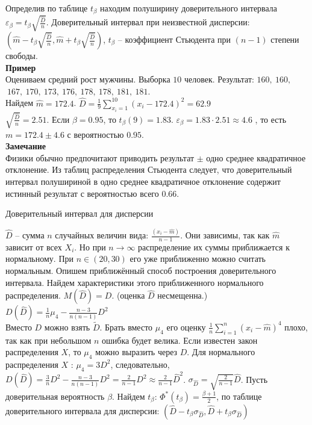 \documentclass[russian, 12pt, fleqn]{article}
\begin{document}
Определив по таблице $t_\beta$ находим полуширину доверительного интервала $\varepsilon_\beta = t_\beta \sqrt{\frac{\hat{D}}{n}}$. Доверительный интервал при неизвестной дисперсии: $(\hat{m} - t_\beta \sqrt{\frac{\hat{D}}{n}}, \hat{m} + t_\beta \sqrt{\frac{\hat{D}}{n}} )$, $t_\beta$  -- коэффициент Стьюдента при $(n-1)$ степени свободы.\\
\textbf{Пример}\\
Оцениваем средний рост мужчины. Выборка $10$ человек. Результат: $160,\ 160,$\\
 $\ 167,\ 170,\ 173,\ 176,\ 178,\ 178,\ 181,\ 181$.\\
Найдем $\hat{m} = 172.4$. $\hat{D} = \frac{1}{9} \displaystyle{\sum \limits _{x_i = 1}^{10}} (x_i - 172.4)^2 = 62.9$\\
$\sqrt{\frac{\hat{D}}{n}} = 2.51$. Если $\beta = 0.95$, то $t_\beta(9) = 1.83$. $\varepsilon_\beta = 1.83 \cdot 2.51 \approx 4.6$ , то есть $m=172.4 \pm 4.6$ с вероятностью $0.95$.\\
\textbf{Замечание\ } \\
Физики обычно предпочитают приводить результат $\pm$ одно среднее квадратичное отклонение. Из таблиц распределения Стьюдента следует, что доверительный интервал полушириной в одно среднее  квадратичное отклонение содержит истинный результат с вероятностью всего $0.66$.
\begin{center}
$\textbf{Доверительный интервал для дисперсии }$
\end{center}
$\hat{D}$ -- сумма $n$ случайных величин вида: $\frac{(x_i - \hat{m})}{n - 1}$. Они зависимы, так как $\hat{m}$ зависит от всех $X_i$. Но при  $n \rightarrow \infty$ распределение их суммы приближается к нормальному. При $n \in (20, 30)$ его уже приближенно можно считать нормальным. Опишем 
приближённый способ построения доверительного интервала. Найдем характеристики этого приближенного нормального распределения. $M(\hat{D}) = D$. (оценка $\hat{D}$ несмещенна.)\\ $D(\hat{D}) = \frac{1}{n}\mu_4 - \frac{n-3}{n(n-1)}D^2$\\
Вместо $D$ можно взять $\tilde{D}$. Брать вместо $\mu_4$ его оценку $\frac{1}{n}\displaystyle{\sum \limits _{i=1} ^ {n} } (x_i - \hat{m})^4$ плохо, так как при небольшом $n$ ошибка будет велика. Если известен закон распределения $X$, то $\mu_4$ можно выразить через $D$. Для нормального распределения $X$ : $\mu_4 = 3D^2$, следовательно, $D(\hat{D}) = \frac{3}{n} D^2 - \frac{n - 3}{n(n-1)}D^2 = \frac{2}{n - 1}D^2 \approx \frac{2}{n - 1} \hat{D}^2 $. $\sigma_{\hat{D}} = \sqrt{\frac{2}{n - 1}} \hat{D}$. Пусть доверительная вероятность $\beta$. Найдем $t_{\beta}$: $\Phi^*(t_{\beta}) = \frac{\beta + 1}{2}$, по таблице доверительного интервала для дисперсии: $(\hat{D} - t_\beta \sigma_{\hat{D}}, \hat{D} + t_\beta \sigma_{\hat{D}})$\\
\end{document}

